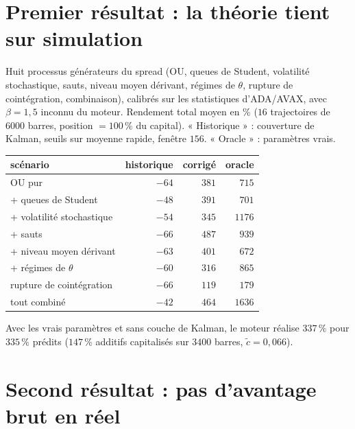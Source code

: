\documentclass[11pt,a4paper]{article}
\theoremstyle{remark}
\begin{document}
\section{Premier résultat : la théorie tient sur simulation}\label{sec:sim}

Huit processus générateurs du spread (OU, queues de Student, volatilité stochastique, sauts, niveau moyen dérivant, régimes de $\theta$, rupture de cointégration, combinaison),
calibrés sur les statistiques d'ADA/AVAX, avec $\beta=1{,}5$ inconnu du moteur. Rendement total moyen en \% ($16$ trajectoires de $6000$ barres,
position $=100\,\%$ du capital). « Historique » : couverture de Kalman, seuils sur moyenne rapide, fenêtre $156$. « Oracle » : paramètres vrais.

\begin{center}
\small
\begin{tabular}{lrrr}
\toprule
scénario & historique & corrigé & oracle\\
\midrule
OU pur & $-64$ & $381$ & $715$\\
+ queues de Student & $-48$ & $391$ & $701$\\
+ volatilité stochastique & $-54$ & $345$ & $1176$\\
+ sauts & $-66$ & $487$ & $939$\\
+ niveau moyen dérivant & $-63$ & $401$ & $672$\\
+ régimes de $\theta$ & $-60$ & $316$ & $865$\\
rupture de cointégration & $-66$ & $119$ & $179$\\
tout combiné & $-42$ & $464$ & $1636$\\
\bottomrule
\end{tabular}
\end{center}

Avec les vrais paramètres et sans couche de Kalman, le moteur réalise $337\,\%$ pour $335\,\%$ prédits ($147\,\%$ additifs capitalisés sur $3400$ barres, $\tilde c=0{,}066$).

\section{Second résultat : pas d'avantage brut en réel}\label{sec:reel}
\end{document}
